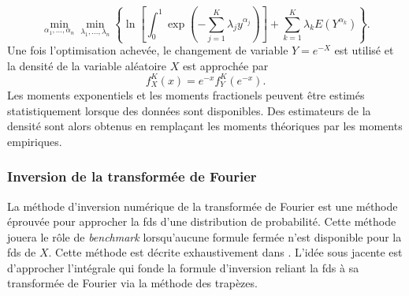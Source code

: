 \begin{equation}
\underset{\alpha_{1},\ldots,\alpha_{n}}{\min}\underset{\lambda_{1},\ldots,\lambda_{n}}{\min}\left\{\ln\left[\int_{0}^{1}\exp\left(-\sum_{j=1}^{K}\lambda_{j}y^{\alpha_{j}}\right)\right] +\sum_{k=1}^{K}\lambda_{k}E\left(Y^{\alpha_{k}}\right)\right\}.
\end{equation}
Une fois l'optimisation achevée, le changement de variable $Y=e^{-X}$ est utilisé et la densité de la variable aléatoire $X$ est approchée par
\begin{equation}
f_{X}^{K}(x)=e^{-x}f_{Y}^{K}(e^{-x}).
\end{equation}
Les moments exponentiels et les moments fractionels peuvent être estimés statistiquement lorsque des données sont disponibles. Des estimateurs de la densité sont alors obtenus en remplaçant les moments théoriques par les moments empiriques. 

\subsubsection{Inversion de la transformée de Fourier}
La méthode d\rq{}inversion numérique de la transformée de Fourier est une méthode éprouvée pour approcher la \gls {fds} d\rq{}une distribution de probabilité. Cette méthode jouera le rôle de \textit{benchmark} lorsqu\rq{}aucune formule fermée n\rq{}est disponible pour la \gls{fds} de $X$. Cette méthode est décrite exhaustivement dans \citet{AbWh92}. L\rq{}idée sous jacente est d\rq{}approcher l\rq{}intégrale qui fonde la formule d\rq{}inversion reliant la \gls{fds} à sa transformée de Fourier via la méthode des trapèzes.\\

